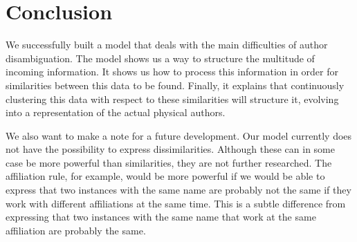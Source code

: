 \section{Conclusion}

We successfully built a model that deals with the main difficulties of author disambiguation. The model shows us a way to structure the multitude of incoming information. It shows us how to process this information in order for similarities between this data to be found. Finally, it explains that continuously clustering this data with respect to these similarities will structure it, evolving into a representation of the actual physical authors.

We also want to make a note for a future development. Our model currently does not have the possibility to express dissimilarities. Although these can in some case be more powerful than similarities, they are not further researched. The affiliation rule, for example, would be more powerful if we would be able to express that two instances with the same name are probably not the same if they work with different affiliations at the same time. This is a subtle difference from expressing that two instances with the same name that work at the same affiliation are probably the same.